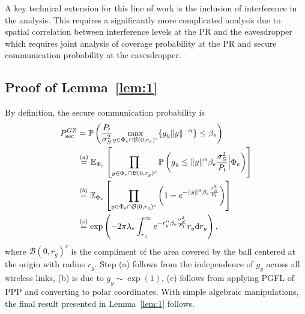\documentclass[final]{IEEEtran}
\begin{document}
A key technical extension for this line of work is the inclusion of interference in the analysis. This requires a significantly more complicated analysis due to spatial correlation between interference levels at the PR and the eavesdropper which requires joint analysis of coverage probability at the PR and secure communication probability at the eavesdropper.
\vspace{-2mm}
\appendix
\vspace{-3mm}
\subsection{Proof of Lemma~\ref{lem:1}}\label{app:2}
By definition, the secure communication probability is
\vspace{-3mm}
\begin{align}
P_{\rm sec}^{GZ}&=\mathbb{P}\left(\frac{P_{t}}{\sigma_S^2}\underset{y\in{\Phi}_{e}\cap\mathcal{B}(0,r_g)^c}{\max}{\{g_y\|y\|^{-\alpha}\}}\leq\beta_e\right)\nonumber\\
&\stackrel{(a)}{=}\mathbb{E}_{{\Phi}_{e}}\left[\prod_{y\in{\Phi}_{e}\cap\mathcal{B}(0,r_g)^c}\mathbb{P}\left(g_y\leq\|y\|^{\alpha}\beta_e\frac{\sigma_S^2}{P_{t}}\Big|\Phi_e\right)\right]\nonumber\\
&\stackrel{(b)}{=}\mathbb{E}_{{\Phi}_{e}}\left[\prod_{y\in{\Phi}_{e}\cap\mathcal{B}(0,r_g)^c}\left(1-e^{-\|y\|^{\alpha}\beta_e\frac{\sigma_S^2}{P_{t}}}\right)\right]\nonumber\\
&\stackrel{(c)}{=}\exp\left(-2\pi{\lambda}_{e}\int_{r_g}^\infty e^{-r_y^{\alpha}\beta_e\frac{\sigma_S^2}{P_{t}}}r_y{\rm d}r_y\right),
\end{align}
where $\mathcal{B}(0,r_g)^c$ is the compliment of the area covered by the ball centered at the origin with radius $r_g$. Step (a) follows from the independence of $g_y$ across all wireless links, (b) is due to $g_y\sim \exp(1)$, (c) follows from applying PGFL of PPP and converting to polar coordinates. With simple algebraic manipulations, the final result presented in Lemma~\ref{lem:1} follows.%
\vspace{-4mm}
\end{document}
